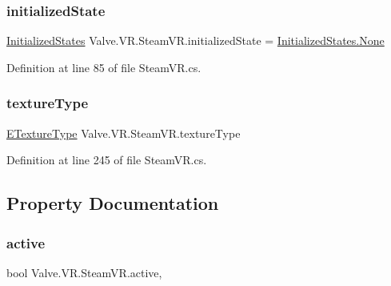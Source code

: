 \subsubsection{\texorpdfstring{initializedState}{initializedState}}
{\footnotesize\ttfamily \mbox{\hyperlink{class_valve_1_1_v_r_1_1_steam_v_r_a09db867d75bbc654801bb318dd85a5e3}{Initialized\+States}} Valve.\+V\+R.\+Steam\+V\+R.\+initialized\+State = \mbox{\hyperlink{class_valve_1_1_v_r_1_1_steam_v_r_a09db867d75bbc654801bb318dd85a5e3a6adf97f83acf6453d4a6a4b1070f3754}{Initialized\+States.\+None}}\hspace{0.3cm}{\ttfamily [static]}}



Definition at line 85 of file Steam\+V\+R.\+cs.

\mbox{\label{class_valve_1_1_v_r_1_1_steam_v_r_ab18af3cf2ec5ed39ceee8901c9df6f1f}} 
\subsubsection{\texorpdfstring{textureType}{textureType}}
{\footnotesize\ttfamily \mbox{\hyperlink{namespace_valve_1_1_v_r_a9481de640e411eef49c2f3fdca82eaa3}{E\+Texture\+Type}} Valve.\+V\+R.\+Steam\+V\+R.\+texture\+Type}



Definition at line 245 of file Steam\+V\+R.\+cs.



\subsection{Property Documentation}
\mbox{\label{class_valve_1_1_v_r_1_1_steam_v_r_ad98d1d8dafb84740b3a005d435da62a5}} 
\subsubsection{\texorpdfstring{active}{active}}
{\footnotesize\ttfamily bool Valve.\+V\+R.\+Steam\+V\+R.\+active\hspace{0.3cm}{\ttfamily [static]}, {\ttfamily [get]}}



